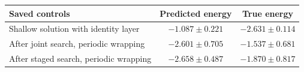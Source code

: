 \begin{tabular}{lcc}
\toprule
Saved controls & Predicted energy & True energy \\
\midrule
Shallow solution with identity layer & $-1.087\pm0.221$ & $-2.631\pm0.114$ \\
After joint search, periodic wrapping & $-2.601\pm0.705$ & $-1.537\pm0.681$ \\
After staged search, periodic wrapping & $-2.658\pm0.487$ & $-1.870\pm0.817$ \\
\bottomrule
\end{tabular}

